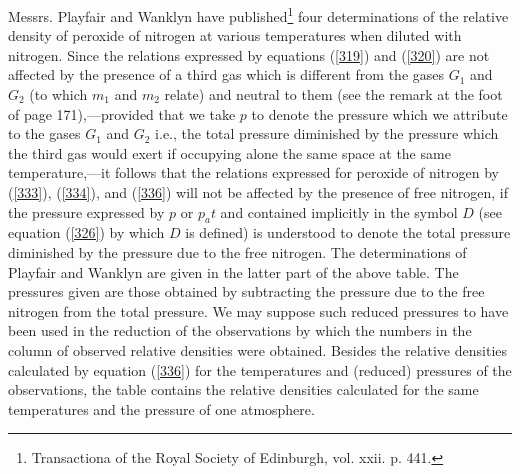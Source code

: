\documentclass[12pt]{article}
\begin{document}
Messrs. Playfair and Wanklyn have published\footnote{Transactiona of the Royal Society of Edinburgh, vol. xxii. p. 441.} four determinations of the relative density of peroxide of nitrogen at various temperatures when diluted with nitrogen. Since the relations expressed by equations (\ref{319}) and (\ref{320}) are not affected by the presence of a third gas which is different from the gases $G_1$  and $G_2$ (to which $m_1$ and $m_2$ relate) and neutral to them (see the remark at the foot of page 171),---provided that we take $p$ to denote the pressure which we attribute to the gases $G_1$ and $G_2$ i.e., the total pressure diminished by the pressure which the third gas would exert if occupying alone the same space at the same temperature,---it follows that the relations expressed for peroxide of nitrogen by (\ref{333}), (\ref{334}), and (\ref{336}) will not be affected by the presence of free nitrogen, if the pressure expressed by $p$ or $p_at$ and contained implicitly in the symbol $D$ (see equation (\ref{326}) by which $D$ is defined) is understood to denote the total pressure diminished by the pressure due to the free nitrogen. The determinations of Playfair and Wanklyn are given in the latter part of the above table. The pressures given are those obtained by subtracting the pressure due to the free nitrogen from the total pressure. We may suppose such reduced pressures to have been used in the reduction of the observations by which the numbers in the column of observed relative densities were obtained. Besides the relative densities calculated by equation (\ref{336}) for the temperatures and (reduced) pressures of the observations, the table contains the relative densities calculated for the same temperatures and the pressure of one atmosphere.
\end{document}
